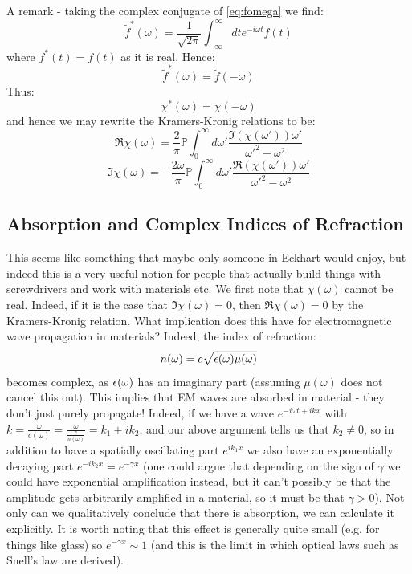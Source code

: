 A remark - taking the complex conjugate of \eqref{eq:fomega} we find:
\begin{equation}
    \tilde{f}^*(\omega) = \frac{1}{\sqrt{2\pi}}\int_{-\infty}^\infty dt e^{-i\omega t}f(t)
\end{equation}
where $f^*(t) = f(t)$ as it is real. Hence:
\begin{equation}
    \tilde{f}^*(\omega) = \tilde{f}(-\omega)
\end{equation}
Thus:
\begin{equation}
    \chi^*(\omega) = \chi(-\omega)
\end{equation}
and hence we may rewrite the Kramers-Kronig relations to be:
\begin{equation}
    \Re \chi(\omega) = \frac{2}{\pi}\mathbb{P}\int_0^\infty d\omega' \frac{\Im(\chi(\omega'))\omega'}{\omega'^2 - \omega^2}
\end{equation}
\begin{equation}
    \Im \chi(\omega) = -\frac{2\omega}{\pi}\mathbb{P}\int_0^\infty d\omega' \frac{\Re(\chi(\omega'))\omega'}{\omega'^2 - \omega^2}
\end{equation}

\subsection{Absorption and Complex Indices of Refraction}
This seems like something that maybe only someone in Eckhart would enjoy, but indeed this is a very useful notion for people that actually build things with screwdrivers and work with materials etc. We first note that $\chi(\omega)$ cannot be real. Indeed, if it is the case that $\Im\chi(\omega) = 0$, then $\Re\chi(\omega) = 0$ by the Kramers-Kronig relation. What implication does this have for electromagnetic wave propagation in materials? Indeed, the index of refraction:
\begin{equation}
    n(\omega) = c\sqrt{\epsilon(\omega)\mu(\omega)}
\end{equation}
becomes complex, as $\epsilon(\omega)$ has an imaginary part (assuming $\mu(\omega)$ does not cancel this out). This implies that EM waves are absorbed in material - they don't just purely propagate! Indeed, if we have a wave $e^{-i\omega t + ikx}$ with $k = \frac{\omega}{c(\omega)} = \frac{\omega}{\frac{c}{n(\omega)}} = k_1 + ik_2$, and our above argument tells us that $k_2 \neq 0$, so in addition to have a spatially oscillating part $e^{ik_1 x}$ we also have an exponentially decaying part $e^{-ik_2 x} = e^{-\gamma x}$ (one could argue that depending on the sign of $\gamma$ we could have exponential amplification instead, but it can't possibly be that the amplitude gets arbitrarily amplified in a material, so it must be that $\gamma > 0$). Not only can we qualitatively conclude that there is absorption, we can calculate it explicitly. It is worth noting that this effect is generally quite small (e.g. for things like glass) so $e^{-\gamma x} \sim 1$ (and this is the limit in which optical laws such as Snell's law are derived).

